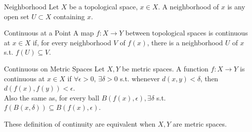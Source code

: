 \begin{definition}{Neighborhood}{}
    Let $X$ be a topological space, $x \in X$. A neighborhood of $x$ is any open set $U \subset X$ containing $x$.
\end{definition}
\begin{definition}{Continuous at a Point}{}
    A map $f: X \to Y$ between topological spaces is continuous at $x \in X$ if, for every neighborhood $V$ of $f(x)$, there is a neighborhood $U$ of $x$ s.t. $f(U) \subseteq V$.
\end{definition}

\begin{definition}{Continuous on Metric Spaces}{}
    Let $X,Y$ be metric spaces. A function $f: X \to Y$ is continuous at $x \in X$ if $\forall \epsilon >0$, $\exists \delta >0$ s.t. whenever $d(x,y) < \delta$, then $d(f(x),f(y)) < \epsilon$.\\
    Also the same as, for every ball $B(f(x),\epsilon), \exists \delta$ s.t. $f(B(x,\delta)) \subseteq B(f(x),\epsilon)$.
\end{definition}

\begin{proposition}{}{}
    These definition of continuity are equivalent when $X,Y$ are metric spaces.
\end{proposition}

